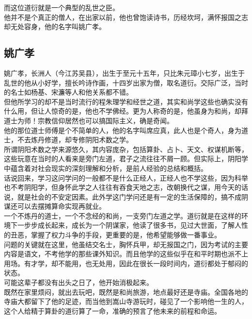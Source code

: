 \begin{multicols}{\theparacolNo}
而这位道衍就是一个典型的乱世之臣。\\

他并不是个真正的僧人，在出家以前，他也曾饱读诗书，历经坎坷，满怀报国之志却无处容身，他的名字叫姚广孝。\\

\subsection{姚广孝}
姚广孝，长洲人（今江苏吴县），出生于至元十五年，只比朱元璋小七岁，出生于乱世的他从小好学，擅长吟诗作画，十四岁出家为僧，取名道衍。交际广泛，当时的名士如杨基、宋濂等人和他关系都不错。\\

但他所学习的却不是当时流行的程朱理学和经世之道，其实和尚学这些也确实没有什么用，但让人惊奇的是，他也不学佛经。更为人称奇的是，他虽身为和尚，却拜道士为师！宗教信仰居然也可以搞国际主义，确是奇闻。\\

他的那位道士师傅是个不简单的人，他的名字叫席应真，此人也是个奇人，身为道士，不去炼丹修道，却专修阴阳术数之学。\\

所谓阴阳术数之学来源悠久，其内容庞杂，包括算卦、占卜、天文、权谋机断等，这些玩意在当时的人看来是旁门左道，君子之流往往不屑一顾。但实际上，阴阳学中蕴含着对社会现实的深刻理解和分析，是前人经验的总结和概括。\\

话说回来，学习这问学问的一般都不是什么正经人，正经人也不学这些，因为科举也不考阴阳学，但身怀此学之人往往有吞食天地之志，改朝换代之谋，用今天的话说，就是社会的不安定因素。此外学这门学问还是有一定的生活保障的，搞不成阴谋还可以去摆摊算命实现再就业。\\

一个不炼丹的道士，一个不念经的和尚，一支旁门左道之学。道衍就是在这样的环境下一步步成长起来，成长为一个阴谋家，他读了很多书，见过大世面，了解人性的丑恶，掌握了权力斗争的手段，更重要的是，他希望能够做一番事业。\\

问题的关键就在这里，他虽结交名士，胸怀兵甲，却无报国之门，因为考试的主要内容是语文，不考他学的那些课外知识。而且他学的这些似乎在和平时期也派不上用场。有才学，却不能用，也无处用，因此在很长一段时间内，道衍都处于郁闷的状态。\\

可能这辈子都没有出头之日了，他开始消极起来。\\

既然在家里烦闷，就出去玩吧，既然是和尚旅游，地点最好还是寺庙。全国各地的寺庙大都留下了他的足迹，而当他到嵩山寺游玩时，碰见了一个影响他一生的人，这个人给精于算卦的道衍算了一命，准确的预言了他未来的前程和命运。\\


\end{multicols}
